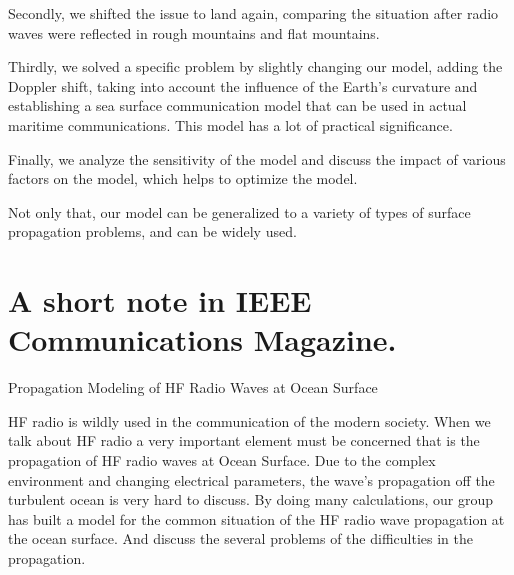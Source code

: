 \documentclass{mcmthesis}
\begin{document}
Secondly, we shifted the issue to land again, comparing the situation after radio waves were reflected in rough mountains and flat mountains.

Thirdly, we solved a specific problem by slightly changing our model, adding the Doppler shift, taking into account the influence of the Earth's curvature and establishing a sea surface communication model that can be used in actual maritime communications. This model has a lot of practical significance.

Finally, we analyze the sensitivity of the model and discuss the impact of various factors on the model, which helps to optimize the model.

Not only that, our model can be generalized to a variety of types of surface propagation problems, and can be widely used.







\section{A short note in IEEE Communications Magazine.}
\begin{Large}
\centerline{Propagation Modeling of HF Radio Waves at Ocean Surface}
\end{Large}
HF radio is wildly used in the communication of the modern society. When we talk about HF radio a very important element must be concerned that is the propagation of HF radio waves at Ocean Surface. Due to the complex environment and changing electrical parameters, the wave's propagation off the turbulent ocean is very hard to discuss. By doing many calculations, our group has built a model for the common situation of the HF radio wave propagation at the ocean surface. And discuss the several problems of the difficulties in the propagation.
\end{document}
